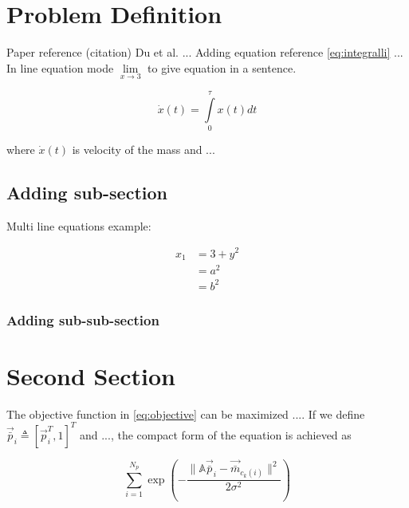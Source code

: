 \documentclass[letterpaper,12pt]{article}
\begin{document}
\tableofcontents


\section{Problem Definition}

Paper reference (citation) Du et al. \cite{du2010affine} ... Adding equation reference \eqref{eq:integralli} ... In line equation mode $\lim\limits_{x \rightarrow 3}$ to give equation in a sentence.

\begin{equation}
\label{eq:integralli} %
\dot{x}(t) = \int\limits_{0}^{\tau} x(t) dt
\end{equation}

\noindent
where $\dot{x}(t)$ is velocity of the mass and ...

\subsection{Adding sub-section}

Multi line equations example:

\begin{align} %
x_1&=3 + y^2 \\
&= a^2  \nonumber \\  %
&= b^2
\end{align}

\subsubsection{Adding sub-sub-section}

\lipsum[3]

\section{Second Section}

The objective function in \eqref{eq:objective} can be maximized .... If we define $\vec{\bar{p}}_i\triangleq \left[\vec{p}_i^T, 1 \right]^T$ and ..., the compact form of the equation is achieved as 

\begin{equation}
\label{eq:objective}
\sum_{i=1}^{\mathit{N_p}}\exp \left( -\dfrac{\lVert\mathbb{A}\vec{\bar{p}}_i-\vec{\bar{m}}_{c_{k}(i)}\rVert^2}{2\sigma^2}\right)
\end{equation}
\end{document}
